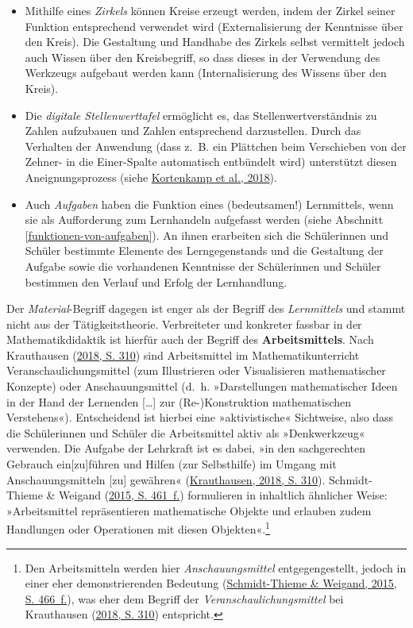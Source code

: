 \documentclass[
]{scrbook}
\providecommand{\tightlist}{%
  \setlength{\itemsep}{0pt}\setlength{\parskip}{0pt}}
\theoremstyle{definition}
\theoremstyle{definition}
\theoremstyle{definition}
\theoremstyle{definition}
\theoremstyle{remark}
\begin{document}
\begin{itemize}
\tightlist
\item
  Mithilfe eines \emph{Zirkels} können Kreise erzeugt werden, indem der Zirkel seiner Funktion entsprechend verwendet wird (Externalisierung der Kenntnisse über den Kreis). Die Gestaltung und Handhabe des Zirkels selbst vermittelt jedoch auch Wissen über den Kreisbegriff, so dass dieses in der Verwendung des Werkzeugs aufgebaut werden kann (Internalisierung des Wissens über den Kreis).
\item
  Die \emph{digitale Stellenwerttafel} ermöglicht es, das Stellenwertverständnis zu Zahlen aufzubauen und Zahlen entsprechend darzustellen. Durch das Verhalten der Anwendung (dass z.~B. ein Plättchen beim Verschieben von der Zehner- in die Einer-Spalte automatisch entbündelt wird) unterstützt diesen Aneignungsprozess (siehe \protect\hyperlink{ref-Kortenkamp2018a}{Kortenkamp et al., 2018}).
\item
  Auch \emph{Aufgaben} haben die Funktion eines (bedeutsamen!) Lernmittels, wenn sie als Aufforderung zum Lernhandeln aufgefasst werden (siehe Abschnitt \ref{funktionen-von-aufgaben}). An ihnen erarbeiten sich die Schülerinnen und Schüler bestimmte Elemente des Lerngegenstands und die Gestaltung der Aufgabe sowie die vorhandenen Kenntnisse der Schülerinnen und Schüler bestimmen den Verlauf und Erfolg der Lernhandlung.
\end{itemize}

Der \emph{Material}-Begriff dagegen ist enger als der Begriff des \emph{Lernmittels} und stammt nicht aus der Tätigkeitstheorie. Verbreiteter und konkreter fassbar in der Mathematikdidaktik ist hierfür auch der Begriff des \textbf{Arbeitsmittels}. Nach Krauthausen (\protect\hyperlink{ref-Krauthausen:2018}{2018, S. 310}) sind Arbeitsmittel im Mathematikunterricht Veranschaulichungsmittel (zum Illustrieren oder Visualisieren mathematischer Konzepte) oder Anschauungsmittel (d.~h. »Darstellungen mathematischer Ideen in der Hand der Lernenden {[}\ldots{]} zur (Re-)Konstruktion mathematischen Verstehens«). Entscheidend ist hierbei eine »aktivistische« Sichtweise, also dass die Schülerinnen und Schüler die Arbeitsmittel aktiv als »Denkwerkzeug« verwenden. Die Aufgabe der Lehrkraft ist es dabei, »in den sachgerechten Gebrauch ein{[}zu{]}führen und Hilfen (zur Selbsthilfe) im Umgang mit Anschauungsmitteln {[}zu{]} gewähren« (\protect\hyperlink{ref-Krauthausen:2018}{Krauthausen, 2018, S. 310}). Schmidt-Thieme \& Weigand (\protect\hyperlink{ref-Schmidt-Thieme2015}{2015, S. 461~f.}) formulieren in inhaltlich ähnlicher Weise: »Arbeitsmittel repräsentieren mathematische Objekte und erlauben zudem Handlungen oder Operationen mit diesen Objekten«.\footnote{Den Arbeitsmitteln werden hier \emph{Anschauungsmittel} entgegengestellt, jedoch in einer eher demonstrierenden Bedeutung (\protect\hyperlink{ref-Schmidt-Thieme2015}{Schmidt-Thieme \& Weigand, 2015, S. 466~f.}), was eher dem Begriff der \emph{Veranschaulichungsmittel} bei Krauthausen (\protect\hyperlink{ref-Krauthausen:2018}{2018, S. 310}) entspricht.}
\end{document}
